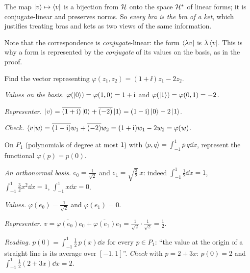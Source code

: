 \begin{corollary}\label{cor:bras-kets}
  The map $\left|v\right\rangle\mapsto\left\langle v\right|$ is a bijection from $\mathcal{H}$ onto the space $\mathcal{H}^*$ of linear forms; it is conjugate-linear and preserves norms. So \emph{every bra is the bra of a ket}, which justifies treating bras and kets as two views of the same information.
\end{corollary}

Note that the correspondence is \emph{conjugate}-linear: the form $\left\langle\lambda v\right|$ is $\bar\lambda\left\langle v\right|$. This is why a form is represented by the \emph{conjugate} of its values on the basis, as in the proof.

\begin{example}\label{ex:riesz-c2}
  Find the vector representing $\varphi(z_1,z_2)=(1+\ii)z_1-2z_2$.
\end{example}
\begin{solution}
  \begin{steps}
    \item \emph{Values on the basis.} $\varphi(\left|0\right\rangle)=\varphi(1,0)=1+\mathrm{i}$ and $\varphi(\left|1\right\rangle)=\varphi(0,1)=-2$.
    \item \emph{Representer.} $\left|v\right\rangle=\overline{(1+\mathrm{i})}\left|0\right\rangle+\overline{(-2)}\left|1\right\rangle=(1-\mathrm{i})\left|0\right\rangle-2\left|1\right\rangle$.
    \item \emph{Check.} $\left\langle v\middle|w\right\rangle=\overline{(1-\mathrm{i})}w_1+\overline{(-2)}w_2=(1+\mathrm{i})w_1-2w_2=\varphi(w)$.
  \end{steps}
\end{solution}

\begin{example}\label{ex:riesz-eval}
  On $P_1$ (polynomials of degree at most $1$) with $\langle p,q\rangle=\int_{-1}^1\overline p\,q\dd x$, represent the functional $\varphi(p)=p(0)$.
\end{example}
\begin{solution}
  \begin{steps}
    \item \emph{An orthonormal basis.} $e_0=\frac1{\sqrt2}$ and $e_1=\sqrt{\tfrac32}\,x$: indeed $\int_{-1}^1\tfrac12\dd x=1$, $\int_{-1}^1\tfrac32x^2\dd x=1$, $\int_{-1}^1x\dd x=0$.
    \item \emph{Values.} $\varphi(e_0)=\tfrac1{\sqrt2}$ and $\varphi(e_1)=0$.
    \item \emph{Representer.} $v=\overline{\varphi(e_0)}e_0+\overline{\varphi(e_1)}e_1=\tfrac1{\sqrt2}\cdot\tfrac1{\sqrt2}=\tfrac12$.
    \item \emph{Reading.} $p(0)=\int_{-1}^1\tfrac12\,p(x)\dd x$ for every $p\in P_1$: ``the value at the origin of a straight line is its average over $[-1,1]$''. \emph{Check} with $p=2+3x$: $p(0)=2$ and $\int_{-1}^1\tfrac12(2+3x)\dd x=2$.
  \end{steps}
\end{solution}

